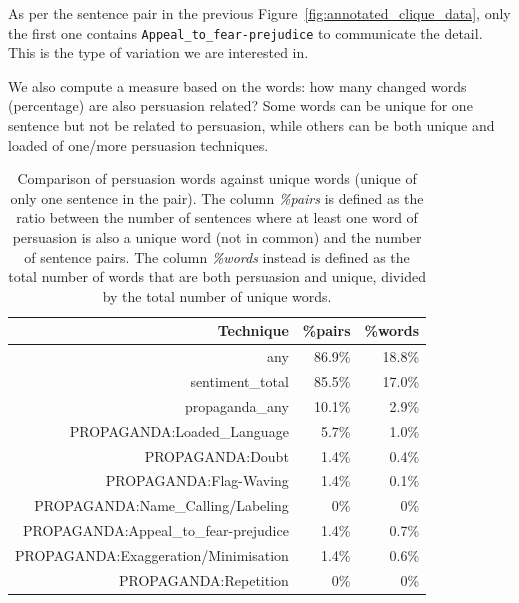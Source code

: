 As per the sentence pair in the previous Figure~\ref{fig:annotated_clique_data}, only the first one contains \texttt{Appeal\_to\_fear-prejudice} to communicate the detail. This is the type of variation we are interested in.




We also compute a measure based on the words: how many changed words (percentage) are also persuasion related? Some words can be unique for one sentence but not be related to persuasion, while others can be both unique and loaded of one/more persuasion techniques.

\begin{table}[!htbp]
    \centering
    \begin{tabular}{r|rr}
         Technique & \%pairs & \%words \\
         \hline
         any & 86.9\% & 18.8\% \\
        sentiment\_total & 85.5\% & 17.0\% \\
        propaganda\_any & 10.1\% & 2.9\% \\
        PROPAGANDA:Loaded\_Language & 5.7\% & 1.0\% \\
        PROPAGANDA:Doubt & 1.4\% & 0.4\% \\
        PROPAGANDA:Flag-Waving & 1.4\% & 0.1\% \\
        PROPAGANDA:Name\_Calling/Labeling & 0\% & 0\% \\
        PROPAGANDA:Appeal\_to\_fear-prejudice & 1.4\% & 0.7\% \\
        PROPAGANDA:Exaggeration/Minimisation & 1.4\% & 0.6\% \\
        PROPAGANDA:Repetition & 0\% & 0\% \\
    \end{tabular}
    \caption{Comparison of persuasion words against unique words (unique of only one sentence in the pair). The column \textit{\%pairs} is defined as the ratio between the number of sentences where at least one word of persuasion is also a unique word (not in common) and the number of sentence pairs. The column \textit{\%words} instead is defined as the total number of words that are both persuasion and unique, divided by the total number of unique words.}
    \label{tab:words_persuasion_in_variations}
\end{table}

